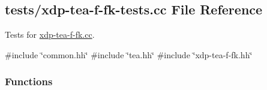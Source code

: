 \hypertarget{xdp-tea-f-fk-tests_8cc}{\subsection{tests/xdp-\/tea-\/f-\/fk-\/tests.cc \-File \-Reference}
\label{xdp-tea-f-fk-tests_8cc}
}


\-Tests for \hyperlink{xdp-tea-f-fk_8cc}{xdp-\/tea-\/f-\/fk.\-cc}.  


{\ttfamily \#include \char`\"{}common.\-hh\char`\"{}}\*
{\ttfamily \#include \char`\"{}tea.\-hh\char`\"{}}\*
{\ttfamily \#include \char`\"{}xdp-\/tea-\/f-\/fk.\-hh\char`\"{}}\*
\subsubsection*{\-Functions}
